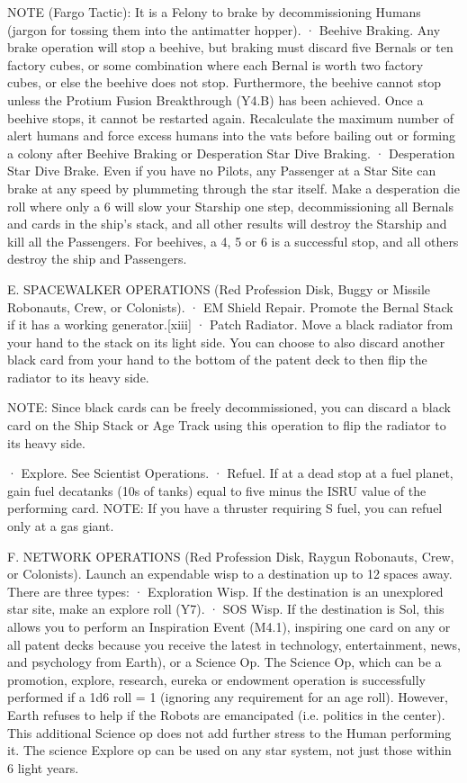 \documentclass[a4paper]{book}
\begin{document}
NOTE (Fargo Tactic): It is a Felony to brake by decommissioning Humans (jargon for tossing them into the antimatter hopper).
·       Beehive Braking. Any brake operation will stop a beehive, but braking must discard five Bernals or ten factory cubes, or some combination where each Bernal is worth two factory cubes, or else the beehive does not stop. Furthermore, the beehive cannot stop unless the Protium Fusion Breakthrough (Y4.B) has been achieved. Once a beehive stops, it cannot be restarted again. Recalculate the maximum number of alert humans and force excess humans into the vats before bailing out or forming a colony after Beehive Braking or Desperation Star Dive Braking.
·       Desperation Star Dive Brake. Even if you have no Pilots, any Passenger at a Star Site can brake at any speed by plummeting through the star itself. Make a desperation die roll where only a 6 will slow your Starship one step, decommissioning all Bernals and cards in the ship’s stack, and all other results will destroy the Starship and kill all the Passengers. For beehives, a 4, 5 or 6 is a successful stop, and all others destroy the ship and Passengers.
 
E. SPACEWALKER OPERATIONS (Red Profession Disk, Buggy or Missile Robonauts, Crew, or Colonists).
·       EM Shield Repair. Promote the Bernal Stack if it has a working generator.[xiii]
·       Patch Radiator. Move a black radiator from your hand to the stack on its light side. You can choose to also discard another black card from your hand to the bottom of the patent deck to then flip the radiator to its heavy side.

NOTE: Since black cards can be freely decommissioned, you can discard a black card on the Ship Stack or Age Track using this operation to flip the radiator to its heavy side.

·       Explore. See Scientist Operations.
·       Refuel. If at a dead stop at a fuel planet, gain fuel decatanks (10s of tanks) equal to five minus the ISRU value of the performing card.
NOTE: If you have a thruster requiring S fuel, you can refuel only at a gas giant.
 
F. NETWORK OPERATIONS (Red Profession Disk, Raygun Robonauts, Crew, or Colonists). Launch an expendable wisp to a destination up to 12 spaces away. There are three types:
·       Exploration Wisp. If the destination is an unexplored star site, make an explore roll (Y7).
·       SOS Wisp. If the destination is Sol, this allows you to perform an Inspiration Event (M4.1), inspiring one card on any or all patent decks because you receive the latest in technology, entertainment, news, and psychology from Earth), or a Science Op. The Science Op, which can be a promotion, explore, research, eureka or endowment operation is successfully performed if a 1d6 roll = 1 (ignoring any requirement for an age roll). However, Earth refuses to help if the Robots are emancipated (i.e. politics in the center). This additional Science op does not add further stress to the Human performing it. The science Explore op can be used on any star system, not just those within 6 light years.
\end{document}
